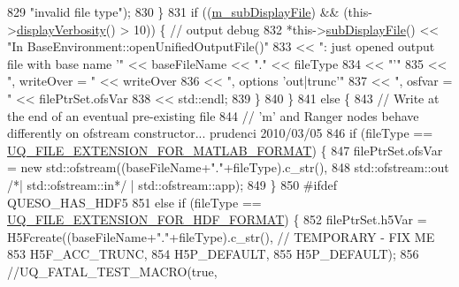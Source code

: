 \begin{DoxyCode}
829                               \textcolor{stringliteral}{"invalid file type"});
830         \}
831         \textcolor{keywordflow}{if} ((\hyperlink{class_q_u_e_s_o_1_1_base_environment_a52b4275aa8ee85994dd304d9fe95c9c5}{m\_subDisplayFile}) && (this->\hyperlink{class_q_u_e_s_o_1_1_base_environment_a1fe5f244fc0316a0ab3e37463f108b96}{displayVerbosity}() > 10)) \{ \textcolor{comment}{//
       output debug}
832           *this->\hyperlink{class_q_u_e_s_o_1_1_base_environment_a8a0064746ae8dddfece4229b9ad374d6}{subDisplayFile}() << \textcolor{stringliteral}{"In BaseEnvironment::openUnifiedOutputFile()"}
833                                   << \textcolor{stringliteral}{": just opened output file with base name '"} << baseFileName << \textcolor{stringliteral}{"."} <<
       fileType
834                                   << \textcolor{stringliteral}{"'"}
835                                   << \textcolor{stringliteral}{", writeOver = "} << writeOver
836                                   << \textcolor{stringliteral}{", options 'out|trunc'"}
837                                   << \textcolor{stringliteral}{", osfvar = "} << filePtrSet.ofsVar
838                                   << std::endl;
839         \}
840       \}
841       \textcolor{keywordflow}{else} \{
843         \textcolor{comment}{// Write at the end of an eventual pre-existing file}
844         \textcolor{comment}{// 'm' and Ranger nodes behave differently on ofstream constructor... prudenci 2010/03/05}
846 \textcolor{comment}{}        \textcolor{keywordflow}{if} (fileType == \hyperlink{_defines_8h_ac440026eff7deb1c1eed1eea0e8e36ba}{UQ\_FILE\_EXTENSION\_FOR\_MATLAB\_FORMAT}) \{
847           filePtrSet.ofsVar = \textcolor{keyword}{new} std::ofstream((baseFileName+\textcolor{stringliteral}{"."}+fileType).c\_str(),
848                                                 std::ofstream::out \textcolor{comment}{/*| std::ofstream::in*/} | 
      std::ofstream::app);
849         \}
850 \textcolor{preprocessor}{#ifdef QUESO\_HAS\_HDF5}
851 \textcolor{preprocessor}{}        \textcolor{keywordflow}{else} \textcolor{keywordflow}{if} (fileType == \hyperlink{_defines_8h_a4ebcc075277d031eb97c90b9a45f4493}{UQ\_FILE\_EXTENSION\_FOR\_HDF\_FORMAT}) \{
852           filePtrSet.h5Var = H5Fcreate((baseFileName+\textcolor{stringliteral}{"."}+fileType).c\_str(), \textcolor{comment}{// TEMPORARY - FIX ME}
853                                        H5F\_ACC\_TRUNC,
854                                        H5P\_DEFAULT,
855                                        H5P\_DEFAULT);
856           \textcolor{comment}{//UQ\_FATAL\_TEST\_MACRO(true,}

\end{DoxyCode}
